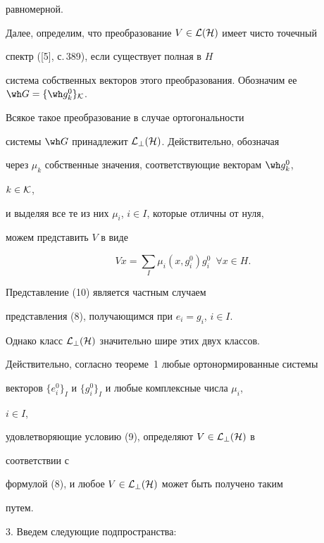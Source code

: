 равномерной. 


 


Далее, определим, что преобразование $V\in\cal L(H)$ имеет чисто точечный 


спектр ([5], с.\,389), если существует полная в $H$ 


система собственных векторов этого преобразования. Обозначим ее $\wh 


G=\{\wh g_k^0\}_{\cal K}$. 


Всякое такое преобразование в случае ортогональности 


системы $\wh G$ принадлежит $\cal L_\bot(H)$. Действительно, обозначая 


через $\mu_k$ собственные значения, соответствующие векторам $\wh g_k^0$, 


$k\in\cal K$, 


и выделяя все те из них $\mu_i$, $i\in I$, которые отличны от нуля, 


можем представить $V$ в виде 


\begin{equation} 


V x=\sum_I\mu_i(x,g^0_i)g^0_i\ \; \forall x\in H. 


\end{equation} 


Представление (10) является частным случаем 


представления (8), получающимся при $e_i=g_i$, $i\in I$. 


 


Однако класс $\cal L_\bot(H)$ значительно шире этих двух классов. 


Действительно, согласно теореме~1 любые ортонормированные системы 


векторов $\{e^0_i\}_I$ и $\{g^0_i\}_I$ и любые комплексные числа $\mu_i$, 


$i\in I$, 


удовлетворяющие условию (9), определяют $V\in\cal L_\bot(H)$ в 


соответствии с 


формулой (8), и любое $V\in\cal L_\bot(H)$ может быть получено таким 


путем. 


\smallskip 


 


3. Введем следующие подпространства: 


$$ 


